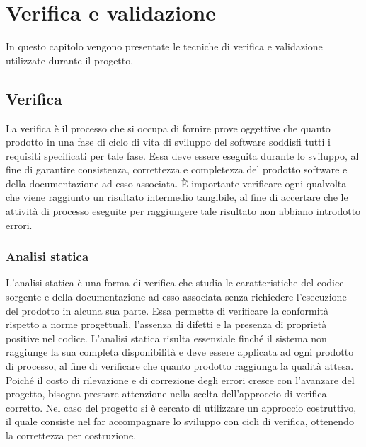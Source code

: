 
\chapter{Verifica e validazione}
\label{cap:verifica-validazione}

In questo capitolo vengono presentate le tecniche di verifica e validazione utilizzate durante il progetto.

\section{Verifica}

La verifica è il processo che si occupa di fornire prove oggettive che quanto prodotto in una fase di ciclo di vita di sviluppo del software soddisfi tutti i requisiti specificati per tale fase. Essa deve essere eseguita durante lo sviluppo, al fine di garantire consistenza, correttezza e completezza del prodotto software e della documentazione ad esso associata. È importante verificare ogni qualvolta che viene raggiunto un risultato intermedio tangibile, al fine di accertare che le attività di processo eseguite per raggiungere tale risultato non abbiano introdotto errori.

\subsection{Analisi statica}

L'analisi statica è una forma di verifica che studia le caratteristiche del codice sorgente e della documentazione ad esso associata senza richiedere l'esecuzione del prodotto in alcuna sua parte. Essa permette di verificare la conformità rispetto a norme progettuali, l'assenza di difetti e la presenza di proprietà positive nel codice. L'analisi statica risulta essenziale finché il sistema non raggiunge la sua completa disponibilità e deve essere applicata ad ogni prodotto di processo, al fine di verificare che quanto prodotto raggiunga la qualità attesa. Poiché il costo di rilevazione e di correzione degli errori cresce con l'avanzare del progetto, bisogna prestare attenzione nella scelta dell'approccio di verifica corretto. Nel caso del progetto si è cercato di utilizzare un approccio costruttivo, il quale consiste nel far accompagnare lo sviluppo con cicli di verifica, ottenendo la correttezza per costruzione.

